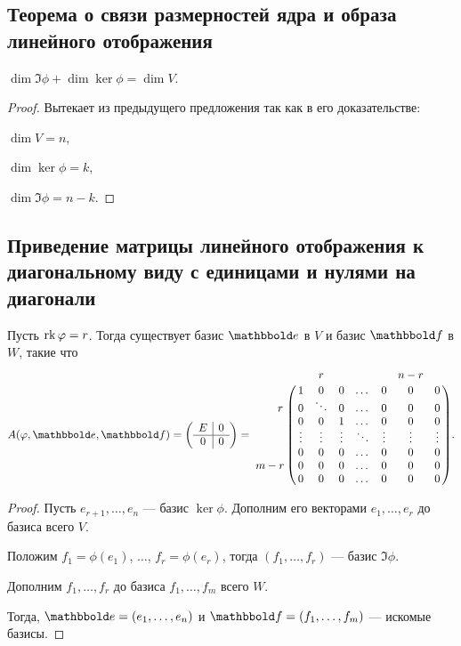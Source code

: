 \subsection{Теорема о связи размерностей ядра и образа линейного отображения}

\begin{theorem}
    $\dim \Im \phi + \dim \ker \phi = \dim V$.
\end{theorem}

\begin{proof}
    Вытекает из предыдущего предложения так как в его доказательстве:

    $\dim V = n$,

    $\dim \ker \phi = k$,

    $\dim \Im \phi = n - k$.
\end{proof}


\subsection{Приведение матрицы линейного отображения к диагональному виду с единицами и нулями на диагонали}

\begin{proposal}
    Пусть $\operatorname{\mathop{\mathrm{rk}}} \varphi = r$. Тогда существует базис $\E$ в $V$ и базис $\F$ в $W$, такие что
    \begin{equation*}
        A(\phi, \E, \F) = \left(
            \begin{array}{c|c}
                E & 0 \\
                \hline
                0 & 0
            \end{array}
        \right) = \bordermatrix{    
            &   & r &   &   &   & n - r &   \cr
            & 1 & 0 & 0 & \dots & 0 & 0 & 0 \cr
          \hspace{0.7cm} r & 0 & \ddots & 0 & \dots & 0 & 0 & 0 \cr
            & 0 & 0 & 1 & \dots & 0 & 0 & 0 \cr
            & \vdots & \vdots & \vdots & \ddots & \vdots & \vdots & \vdots \cr
            & 0 & 0 & 0 & \dots & 0 & 0 & 0 \cr
      m - r & 0 & 0 & 0 & \dots & 0 & 0 & 0 \cr
            & 0 & 0 & 0 & \dots & 0 & 0 & 0
        }
    .\end{equation*}
\end{proposal}

\begin{proof}
    Пусть $e_{r + 1}, \dots, e_n$ --- базис $\ker \phi$. Дополним его векторами $e_1, \dots, e_r$ до базиса всего $V$.

    Положим $f_1 = \phi(e_1)$, $\dots$, $f_r = \phi(e_r)$, тогда $(f_1, \dots, f_r)$ --- базис $\Im \phi$.

    Дополним $f_1, \dots, f_r$ до базиса $f_1, \dots, f_m$ всего $W$.

    Тогда, $\E = (e_1, \dots, e_n)$ и $\F = (f_1, \dots, f_m)$ --- искомые базисы.
\end{proof}

